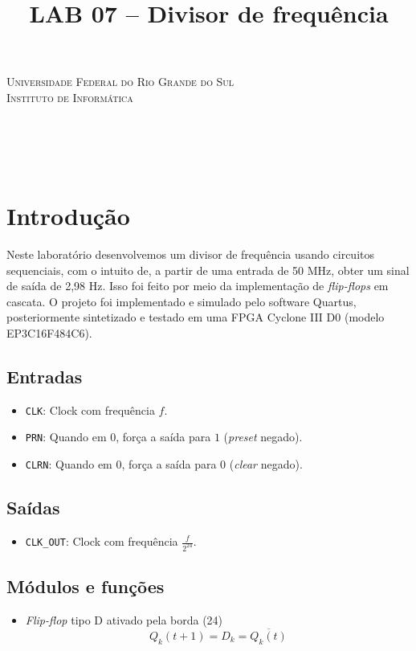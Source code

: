 \documentclass[12pt, fleqn]{article}
\title{LAB 07 – Divisor de frequência}
\renewcommand{\maketitle}{
    \begin{titlepage}
        \begin{center}
            {\scshape Universidade Federal do Rio Grande do Sul\\Instituto de Informática} \\
            \vspace*{\fill}
            {\large \thecourse} \\[16pt]
            {\Huge \thetitle} \\[36pt]
            \theauthors \\
            \vspace*{\fill}
            \theprofessor \\[2pt]
            \thesemester
        \end{center}
    \end{titlepage}
}
\begin{document}
\maketitle

\section{Introdução}

Neste laboratório desenvolvemos um divisor de frequência usando circuitos sequenciais, com o intuito de, a partir de uma entrada de 50 MHz, obter um sinal de saída de 2,98 Hz. Isso foi feito por meio da implementação de \textit{flip-flops} em cascata. O projeto foi implementado e simulado pelo software Quartus, posteriormente sintetizado e testado em uma FPGA Cyclone III D0 (modelo EP3C16F484C6).

\subsection{Entradas}

\begin{itemize}
    \item \texttt{CLK}:\hspace{3pt} Clock com frequência $f$.
    \item \texttt{PRN}:\hspace{3pt} Quando em $0$, força a saída para $1$ (\textit{preset} negado).
    \item \texttt{CLRN}:\hspace{3pt} Quando em $0$, força a saída para $0$ (\textit{clear} negado).
\end{itemize}

\subsection{Saídas}

\begin{itemize}
    \item \texttt{CLK\_OUT}:\hspace{3pt} Clock com frequência $\frac{f}{2^{24}}$.
\end{itemize}

\subsection{Módulos e funções}

\begin{itemize}
    \item \textit{Flip-flop} tipo D ativado pela borda (24)
    $$Q_{k}(t + 1) = D_k = \overline{Q_{k}(t)}$$
\end{itemize}
\end{document}
